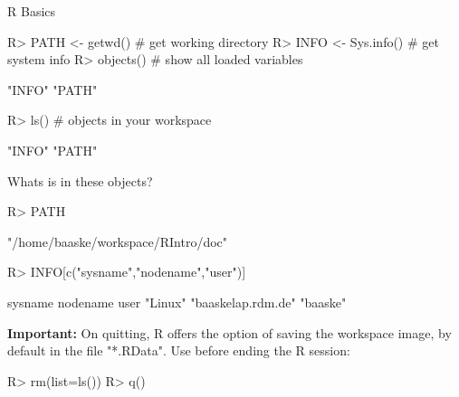 \documentclass[10pt]{beamer}
\let\proglang=\textsf
\begin{document}
\begin{frame}[fragile]{\proglang{R} Basics}
\begin{Schunk}
\begin{Sinput}
R> PATH <- getwd()        # get working directory
R> INFO <- Sys.info()     # get system info  
R> objects()              # show all loaded variables
\end{Sinput}
\begin{Soutput}
[1] "INFO" "PATH"
\end{Soutput}
\begin{Sinput}
R> ls()                   # objects in your workspace
\end{Sinput}
\begin{Soutput}
[1] "INFO" "PATH"
\end{Soutput}
\end{Schunk}
Whats is in these objects?
\begin{Schunk}
\begin{Sinput}
R> PATH
\end{Sinput}
\begin{Soutput}
[1] "/home/baaske/workspace/RIntro/doc"
\end{Soutput}
\begin{Sinput}
R> INFO[c("sysname","nodename","user")]
\end{Sinput}
\begin{Soutput}
           sysname           nodename               user 
           "Linux" "baaskelap.rdm.de"           "baaske" 
\end{Soutput}
\end{Schunk}
\textbf{Important:} On quitting, R offers the option of saving the workspace
image, by default in the file "*.RData". Use before ending the R session:
\begin{Schunk}
\begin{Sinput}
R> rm(list=ls())
R> q()
\end{Sinput}
\end{Schunk}
\end{frame}
%
\end{document}
